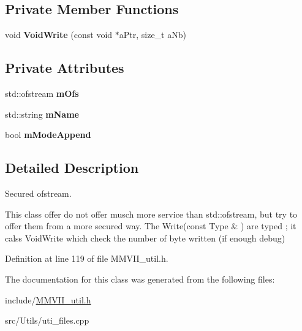 \subsection*{Private Member Functions}
\begin{DoxyCompactItemize}
\item 
void {\bfseries Void\+Write} (const void $\ast$a\+Ptr, size\+\_\+t a\+Nb)\hypertarget{classMMVII_1_1cMMVII__Ofs_a5fe69c5f55fec446ffdf1d22ef3125c5}{}\label{classMMVII_1_1cMMVII__Ofs_a5fe69c5f55fec446ffdf1d22ef3125c5}

\end{DoxyCompactItemize}
\subsection*{Private Attributes}
\begin{DoxyCompactItemize}
\item 
std\+::ofstream {\bfseries m\+Ofs}\hypertarget{classMMVII_1_1cMMVII__Ofs_a9db25e21ffaa43c95f66d83e780bcbc4}{}\label{classMMVII_1_1cMMVII__Ofs_a9db25e21ffaa43c95f66d83e780bcbc4}

\item 
std\+::string {\bfseries m\+Name}\hypertarget{classMMVII_1_1cMMVII__Ofs_aa726c0dee970ae9571cdbaedda98649a}{}\label{classMMVII_1_1cMMVII__Ofs_aa726c0dee970ae9571cdbaedda98649a}

\item 
bool {\bfseries m\+Mode\+Append}\hypertarget{classMMVII_1_1cMMVII__Ofs_aea3fffd2ca6f85ae70650d1ba6e50ce9}{}\label{classMMVII_1_1cMMVII__Ofs_aea3fffd2ca6f85ae70650d1ba6e50ce9}

\end{DoxyCompactItemize}


\subsection{Detailed Description}
Secured ofstream. 

This class offer do not offer musch more service than std\+::ofstream, but try to offer them from a more secured way. The Write(const Type \& ) are typed ; it calss Void\+Write which check the number of byte written (if enough debug) 

Definition at line 119 of file M\+M\+V\+I\+I\+\_\+util.\+h.



The documentation for this class was generated from the following files\+:\begin{DoxyCompactItemize}
\item 
include/\hyperlink{MMVII__util_8h}{M\+M\+V\+I\+I\+\_\+util.\+h}\item 
src/\+Utils/uti\+\_\+files.\+cpp\end{DoxyCompactItemize}
